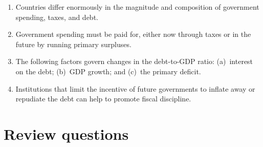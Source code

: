 \setlength{\leftmargini}{.5\oldleftmargini}
\begin{enumerate}

\item Countries differ enormously in the magnitude and composition
of government spending, taxes, and debt.

\item Government spending must be paid for, either now through
taxes or in the future by running primary surpluses.

\item The following factors govern changes in the debt-to-GDP ratio:
(a)~interest on the debt;
(b)~GDP growth;
and (c)~the primary deficit.

\item Institutions that limit the incentive of future governments to inflate
away or repudiate the debt can help to promote fiscal discipline.

\end{enumerate}
\setlength{\leftmargini}{\oldleftmargini}

\section*{Review questions}

